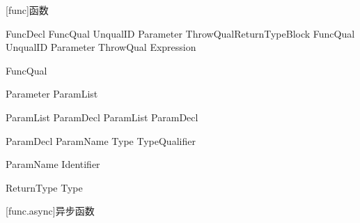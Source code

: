 
[func]{函数}

\begin{bnf}{FuncDecl}
    FuncQual\bnfs {} UnqualID Parameter ThrowQual\bnfq ReturnType\bnfq Block \br
    FuncQual\bnfs {} UnqualID Parameter ThrowQual\bnfq \terminal{=>} Expression \terminal{;}
\end{bnf}

\begin{bnf}{FuncQual}
     \br
     \br
\end{bnf}

\begin{bnf}{Parameter}
    \terminal{(} ParamList\bnfq \terminal{)}
\end{bnf}

\begin{bnf}{ParamList}
    ParamDecl \br
    ParamList \terminal{,} ParamDecl
\end{bnf}

\begin{bnf}{ParamDecl}
    ParamName \terminal{:} Type\bnfq \br
     \terminal{:} TypeQualifier\bnfp
\end{bnf}

\begin{bnf}{ParamName}
    Identifier \br
\end{bnf}

\begin{bnf}{ReturnType}
    \terminal{->} Type
\end{bnf}

[func.async]{异步函数}

\pnum
